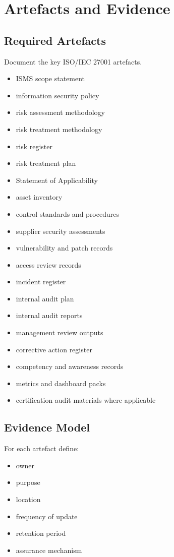 \documentclass[
  letterpaper,
  DIV=11,
  numbers=noendperiod]{scrartcl}
\providecommand{\tightlist}{%
  \setlength{\itemsep}{0pt}\setlength{\parskip}{0pt}}
\begin{document}
\section{Artefacts and Evidence}\label{artefacts-and-evidence}

\subsection{Required Artefacts}\label{required-artefacts}

Document the key ISO/IEC 27001 artefacts.

\begin{itemize}
\tightlist
\item
  ISMS scope statement
\item
  information security policy
\item
  risk assessment methodology
\item
  risk treatment methodology
\item
  risk register
\item
  risk treatment plan
\item
  Statement of Applicability
\item
  asset inventory
\item
  control standards and procedures
\item
  supplier security assessments
\item
  vulnerability and patch records
\item
  access review records
\item
  incident register
\item
  internal audit plan
\item
  internal audit reports
\item
  management review outputs
\item
  corrective action register
\item
  competency and awareness records
\item
  metrics and dashboard packs
\item
  certification audit materials where applicable
\end{itemize}

\subsection{Evidence Model}\label{evidence-model}

For each artefact define:

\begin{itemize}
\tightlist
\item
  owner
\item
  purpose
\item
  location
\item
  frequency of update
\item
  retention period
\item
  assurance mechanism
\end{itemize}
\end{document}
